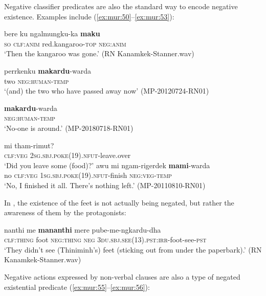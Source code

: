 \documentclass[output=paper,colorlinks,citecolor=brown]{langscibook}
\begin{document}
Negative classifier predicates are also the standard way to encode negative existence. Examples include (\ref{ex:mur:50}--\ref{ex:mur:53}):

\ea\label{ex:mur:50}
    \gll bere ku ngalmungku-ka \textbf{maku}\\
         \textsc{so} \textsc{clf:anim} red.kangaroo-\textsc{top} \textsc{neg:anim}\\
    \glt ‘Then the kangaroo was gone.’ (RN Kanamkek-Stanner.wav)
\z 

\ea\label{ex:mur:51} 
    \gll perrkenku \textbf{makardu}{}-warda\\
         two \textsc{neg:human-temp}\\
    \glt ‘(and) the two who have passed away now’ (MP-20120724-RN01)
\z 

\ea\label{ex:mur:52}
    \gll \textbf{makardu}{}-warda \\
          \textsc{neg:human-temp}\\
    \glt ‘No-one is around.’ (MP-20180718-RN01)
\z 

\ea\label{ex:mur:53} 
    \begin{xlist}[Q: ]
    \label{ex:mur:53Q}
        \gll  mi tham-rimut?\\ 
              \textsc{clf:veg} \textsc{2sg.sbj.poke(19).nfut}{}-leave.over\\
        \glt ‘Did you leave some (food)?’
    \label{ex:mur:53A} %
        \gll  awu mi ngam-rigerdek \textbf{mami}-warda\\
               no \textsc{clf:veg} \textsc{1sg.sbj.poke(19).nfut}{}-finish \textsc{neg:veg-temp}\\
        \glt  ‘No, I finished it all. There’s nothing left.’ (MP-20110810-RN01)
    \end{xlist}
\z 

In , the existence of the feet is not actually being negated, but rather the awareness of them by the protagonists:

\ea\label{ex:mur:54}
    \gll nanthi me \textbf{mananthi} mere pube-me-ngkardu-dha\\
         \textsc{clf:thing} foot \textsc{neg:thing} \textsc{neg} \textsc{3du.sbj.see(13).pst:irr}{}-foot-see-\textsc{pst} \\
    \glt ‘They didn't see (Thiniminh's) feet (sticking out from under the paperbark).’ (RN Kanamkek-Stanner.wav)
\z

Negative actions expressed by non-verbal clauses are also a type of negated existential predicate (\ref{ex:mur:55}--\ref{ex:mur:56}):
\end{document}
